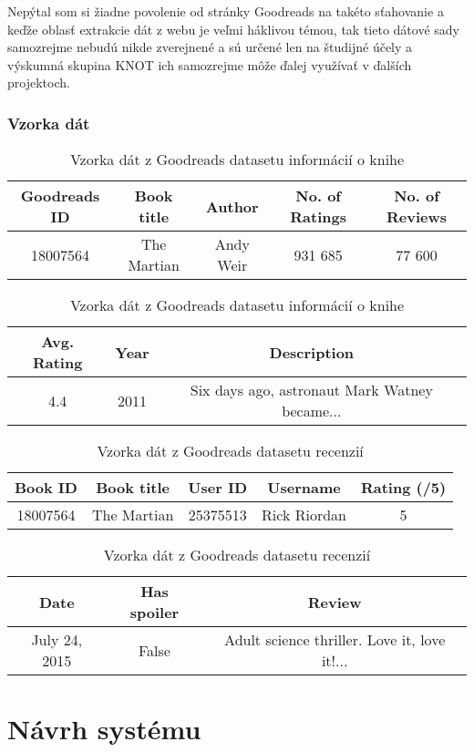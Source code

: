 Nepýtal som si žiadne povolenie od stránky Goodreads na takéto sťahovanie a keďže oblasť extrakcie dát z webu je veľmi háklivou témou, tak tieto dátové sady samozrejme nebudú nikde zverejnené a sú určené len na študijné účely a výskumná skupina KNOT ich samozrejme môže ďalej využívať v ďalších projektoch.

\subsection*{Vzorka dát}

\begin{table}[hbt]
\centering
\caption{Vzorka dát z Goodreads datasetu informácií o knihe}
\label{bookinfo}
\begin{tabular}{|c|c|c|c|c|}
\hline
Goodreads ID & Book title & Author & No. of Ratings & No. of Reviews  \\
\hline
18007564 & The Martian & Andy Weir & 931 685 & 77 600\\ 
\hline
\end{tabular}
\begin{tabular}{|c|c|c|}
\hline
Avg. Rating & Year & Description \\
\hline
4.4  & 2011 & Six days ago, astronaut Mark Watney became... \\ 
\hline
\end{tabular}
\end{table}

\begin{table}[hbt]
\centering
\caption{Vzorka dát z Goodreads datasetu recenzií}
\label{reviewinfo}
\begin{tabular}{|c|c|c|c|c|}
\hline
Book ID & Book title & User ID  & Username & Rating (/5) \\
\hline
18007564 & The Martian & 25375513 & Rick Riordan & 5\\ 
\hline
\end{tabular}
\begin{tabular}{|c|c|c|}
\hline
Date & Has spoiler & Review \\
\hline
July 24, 2015  & False & Adult science thriller.  Love it, love it!...\\ 
\hline
\end{tabular}
\end{table}


\chapter{Návrh systému}
\label{navrh}

